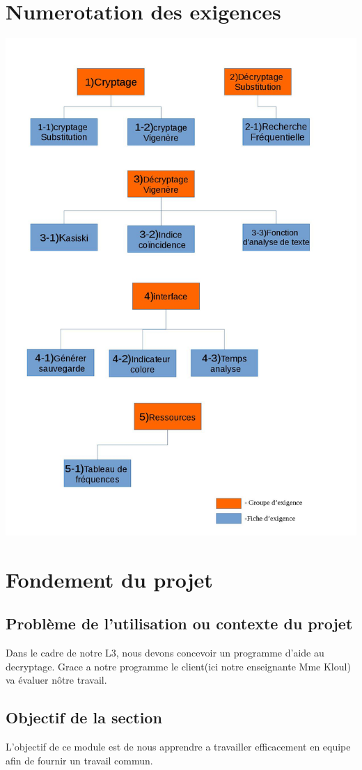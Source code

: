 \documentclass[a4]{article}
\begin{document}
	\section{Numerotation des exigences}
				\includegraphics[scale=0.31]{Arbre.jpg} 
		
	\section{Fondement du projet}
			\subsection{Problème de l'utilisation ou contexte du projet}
				Dans le cadre de notre L3, nous devons concevoir un programme d'aide au decryptage.
				Grace a notre programme le client(ici notre enseignante Mme Kloul) va évaluer nôtre travail.
			\subsection{Objectif de la section}
				L'objectif de ce module est de nous apprendre a travailler efficacement en equipe afin de fournir un travail commun.
\end{document}
